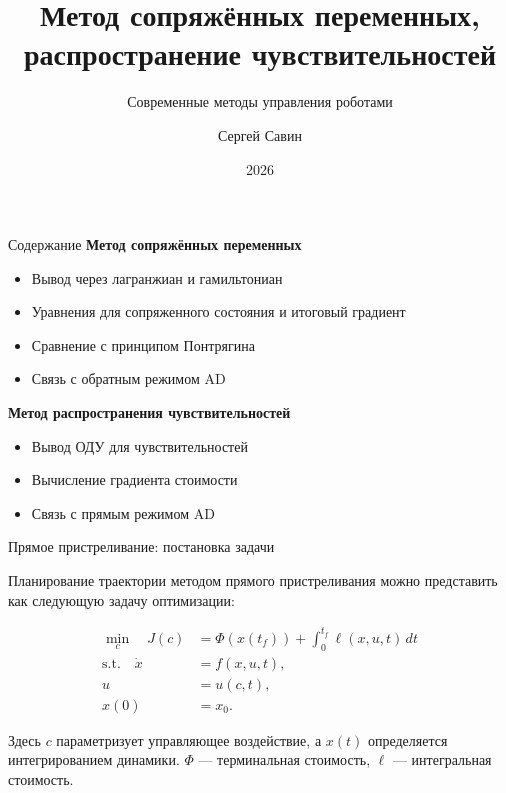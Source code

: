 \documentclass{beamer}
\subtitle{Современные методы управления роботами}
\author{Сергей Савин}
\date{2026}
\title{Метод сопряжённых переменных, распространение чувствительностей}
\begin{document}
	\maketitle
	
	
	\begin{frame}{Содержание}
		\textbf{Метод сопряжённых переменных}
		\begin{itemize}
			\item Вывод через лагранжиан и гамильтониан
			\item Уравнения для сопряженного состояния и итоговый градиент
			\item Сравнение с принципом Понтрягина
			\item Связь с обратным режимом AD
		\end{itemize}
		
		\textbf{Метод распространения чувствительностей}
		\begin{itemize}
			\item Вывод ОДУ для чувствительностей
			\item Вычисление градиента стоимости
			\item Связь с прямым режимом AD
		\end{itemize}
	\end{frame}
	
	
	
	\begin{frame}{Прямое пристреливание: постановка задачи}
		\begin{flushleft}
			Планирование траектории методом прямого пристреливания можно представить как
			следующую задачу оптимизации:
			
			\[
			\boxed{
				\begin{aligned}
					\min_{c}\quad
					J(c)&=\Phi(x(t_f))+
					\int_0^{t_f}\ell(x,u,t)\,dt\\
					\text{s.t.}\quad
					\dot{x}&=f(x,u,t),\\
					u&=u(c,t),\\
					x(0)&=x_0.
				\end{aligned}
			}
			\]
			
			\bigskip
			
			Здесь $c$ параметризует управляющее воздействие, а
			$x(t)$ определяется интегрированием динамики. $\Phi$ --- терминальная стоимость, $\ell$ --- интегральная стоимость.
		\end{flushleft}
	\end{frame}
	
\end{document}

